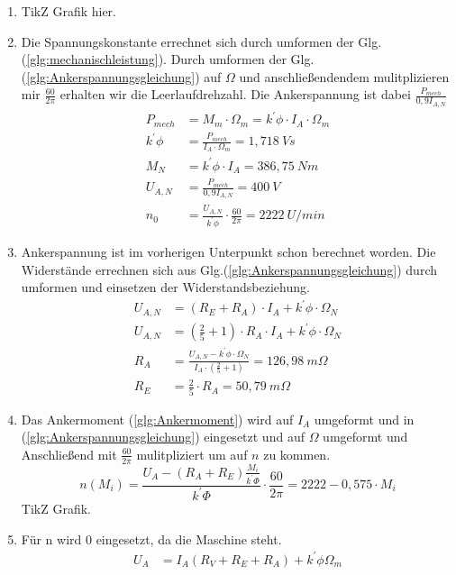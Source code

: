 \begin{solution}
\begin{enumerate}
\item TikZ Grafik hier.
\item Die Spannungskonstante errechnet sich durch umformen der Glg.(\ref{glg:mechanischleistung}). Durch umformen der Glg.(\ref{glg:Ankerspannungsgleichung}) auf $\Omega$ und anschließendendem mulitplizieren mir $\frac{60}{2 \pi}$ erhalten wir die Leerlaufdrehzahl. Die Ankerspannung ist dabei $\frac{P_{mech}}{0,9 I_{A,N}}$
\begin{align}
P_{mech} &=M_m \cdot \Omega_m = k^{'} \phi \cdot I_A \cdot \Omega_m\\
k^{'} \phi &= \frac{P_{mech}}{I_A \cdot \Omega_m} =1,718~Vs\\
M_N &= k^{'} \phi \cdot I_A = 386,75~Nm\\
U_{A,N} &= \frac{P_{mech}}{0,9 I_{A,N}} =400~V\\
n_0 &= \frac{U_{A,N}}{k^{'} \phi} \cdot \frac{60}{2\pi} =2222~U/min
\end{align}
\item Ankerspannung ist im vorherigen Unterpunkt schon berechnet worden. Die Widerstände errechnen sich aus Glg.(\ref{glg:Ankerspannungsgleichung}) durch umformen und einsetzen der Widerstandsbeziehung.
\begin{align}
U_{A,N} &= (R_E + R_A) \cdot I_A +  k^{'} \phi \cdot \Omega_N\\
U_{A,N} &= \left (\frac{2}{5} + 1 \right ) \cdot R_A \cdot I_A +  k^{'} \phi \cdot \Omega_N\\
R_A &= \frac{U_{A,N}-k^{'} \phi \cdot \Omega_N}{I_A \cdot \left (\frac{2}{5} + 1 \right )}=126,98~m\Omega\\
R_E &= \frac{2}{5} \cdot R_A= 50,79~m\Omega
\end{align}
\item Das Ankermoment (\ref{glg:Ankermoment}) wird auf $I_A$ umgeformt und in (\ref{glg:Ankerspannungsgleichung}) eingesetzt und auf $\Omega$ umgeformt und Anschließend mit $\frac{60}{2 \pi}$ mulitpliziert um auf $n$ zu kommen.
\begin{equation}
n(M_i) = \frac{U_A - (R_A+R_E) \frac{ M_i}{k^{'} \Phi}}{k^{'}\Phi} \cdot \frac{60}{2 \pi} =2222-0,575 \cdot M_i
\end{equation}
TikZ Grafik.\\
\item Für n wird $0$ eingesetzt, da die Maschine steht.
\begin{align}
	U_A &= I_A ( R_V +R_E +R_A) +k^{'} \phi \Omega_m\\

\end{align}
\end{enumerate}
\end{solution}

